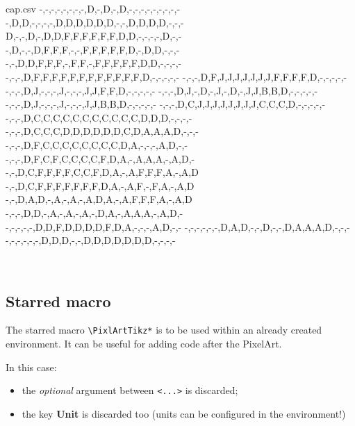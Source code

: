 \documentclass{article}
\newcommand\Cle[1]{{\bfseries\sffamily\textlangle #1\textrangle}}
\begin{document}
\begin{PresentationCode}{}

\begin{filecontents*}[overwrite]{cap.csv}
	-,-,-,-,-,-,-,-,D,-,D,-,D,-,-,-,-,-,-,-,-,-
	-,D,D,-,-,-,-,D,D,D,D,D,D,-,-,D,D,D,D,-,-,-
	D,-,-,D,-,D,D,F,F,F,F,F,F,D,D,-,-,-,-,D,-,-
	-,D,-,-,D,F,F,F,-,-,F,F,F,F,F,D,-,D,D,-,-,-
	-,-,D,D,F,F,F,-,F,F,-,F,F,F,F,F,D,D,-,-,-,-
	-,-,-,D,F,F,F,F,F,F,F,F,F,F,F,F,D,-,-,-,-,-
	-,-,-,D,F,J,J,J,J,J,J,J,F,F,F,F,D,-,-,-,-,-
	-,-,-,D,J,-,-,-,J,-,-,-,J,J,F,F,D,-,-,-,-,-
	-,-,-,D,J,-,D,-,J,-,D,-,J,J,B,B,D,-,-,-,-,-
	-,-,-,D,J,-,-,-,J,-,-,-,J,J,B,B,D,-,-,-,-,-
	-,-,-,D,C,J,J,J,J,J,J,J,J,C,C,C,D,-,-,-,-,-
	-,-,-,D,C,C,C,C,C,C,C,C,C,C,C,D,D,D,-,-,-,-
	-,-,-,D,C,C,C,D,D,D,D,D,D,C,D,A,A,A,D,-,-,-
	-,-,-,D,F,C,C,C,C,C,C,C,C,D,A,-,-,-,A,D,-,-
	-,-,-,D,F,C,F,C,C,C,C,F,D,A,-,A,A,A,-,A,D,-
	-,-,D,C,F,F,F,F,C,C,F,D,A,-,A,F,F,F,A,-,A,D
	-,-,D,C,F,F,F,F,F,F,F,D,A,-,A,F,-,F,A,-,A,D
	-,-,D,A,D,-,A,-,A,-,A,D,A,-,A,F,F,F,A,-,A,D
	-,-,-,D,D,-,A,-,A,-,A,-,D,A,-,A,A,A,-,A,D,-
	-,-,-,-,-,D,D,F,D,D,D,D,F,D,A,-,-,-,A,D,-,-
	-,-,-,-,-,-,D,A,D,-,-,D,-,-,D,A,A,A,D,-,-,-
	-,-,-,-,-,-,D,D,D,-,-,D,D,D,D,D,D,D,-,-,-,-
\end{filecontents*}

~~
\end{PresentationCode}

\pagebreak

\subsection{Starred macro}

The starred macro \texttt{\textbackslash PixlArtTikz*} is to be used within an already created environment. It can be useful for adding code after the PixelArt.

\smallskip

In this case:

\begin{itemize}
	\item the \textit{optional} argument between \texttt{<...>} is discarded;
	\item the key \Cle{Unit} is discarded too (units can be configured in the environment!)
\end{itemize}
\end{document}
